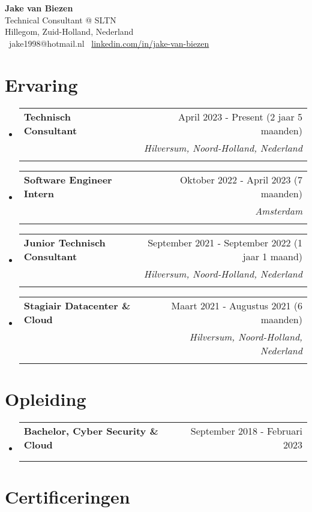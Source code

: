 \documentclass[11pt,a4paper]{article}
\makeatletter
\newcommand{\resumesubheading}[4]{%
  \vspace{-1pt}\item
    \begin{tabular*}{0.97\textwidth}[t]{l@{\extracolsep{\fill}}r}
      \textbf{#1} & #2 \\
      \ifthenelse{\equal{#3}{} \and \equal{#4}{}}{}{%
        \textit{\small#3} & \textit{\small #4} \\
      }%
    \end{tabular*}\vspace{-5pt}%
}
\makeatother
\begin{document}
\begin{center}
    {\Huge \textbf{Jake van Biezen}} \\
    \vspace{5pt}
    {\large Technical Consultant @ SLTN} \\
    \vspace{5pt}
    Hillegom, Zuid-Holland, Nederland \\
    \vspace{8pt}
    \faEnvelope\ jake1998@hotmail.nl \quad
    \faLinkedin\ \href{https://www.linkedin.com/in/jake-van-biezen}{linkedin.com/in/jake-van-biezen}
\end{center}

\vspace{10pt}

\section{Ervaring}

\begin{itemize}[leftmargin=0.15in, label={}]
\resumesubheading
    {Technisch Consultant}{April 2023 - Present (2 jaar 5 maanden)}
    {SLTN}{Hilversum, Noord-Holland, Nederland}
    
\resumesubheading
    {Software Engineer Intern}{Oktober 2022 - April 2023 (7 maanden)}
    {Kepler Vision Technologies}{Amsterdam}
    
\resumesubheading
    {Junior Technisch Consultant}{September 2021 - September 2022 (1 jaar 1 maand)}
    {SLTN}{Hilversum, Noord-Holland, Nederland}
    
\resumesubheading
    {Stagiair Datacenter \& Cloud}{Maart 2021 - Augustus 2021 (6 maanden)}
    {SLTN}{Hilversum, Noord-Holland, Nederland}
\end{itemize}

\section{Opleiding}

\begin{itemize}[leftmargin=0.15in, label={}]
\resumesubheading
    {Bachelor, Cyber Security \& Cloud}{September 2018 - Februari 2023}
    {Hogeschool Utrecht}{}
\end{itemize}

\section{Certificeringen}
\end{document}
